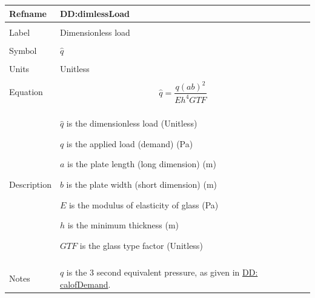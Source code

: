 \documentclass[12pt]{article}
\begin{document}
\noindent \begin{minipage}{\textwidth}
\begin{tabular}{p{} p{}}
\toprule \textbf{Refname} & \textbf{DD:dimlessLoad}
\label{DD:dimlessLoad}
\\ \midrule \\
Label & Dimensionless load
        \\ \midrule \\
        Symbol & $\hat{q}$
                 \\ \midrule \\
                 Units & Unitless
                         \\ \midrule \\
                         Equation & \begin{displaymath}
                                    \hat{q}=\frac{q \left(a b\right)^{2}}{E h^{4} GTF}
                                    \end{displaymath}
                                    \\ \midrule \\
                                    Description & \begin{symbDescription}
                                                  \item{$\hat{q}$ is the dimensionless load (Unitless)}
                                                  \item{$q$ is the applied load (demand) (Pa)}
                                                  \item{$a$ is the plate length (long dimension) (m)}
                                                  \item{$b$ is the plate width (short dimension) (m)}
                                                  \item{$E$ is the modulus of elasticity of glass (Pa)}
                                                  \item{$h$ is the minimum thickness (m)}
                                                  \item{$GTF$ is the glass type factor (Unitless)}
                                                  \end{symbDescription}
                                                  \\ \midrule \\
                                                  Notes & $q$ is the 3 second equivalent pressure, as given in \hyperref[DD:calofDemand]{DD: calofDemand}.

\end{tabular}
\end{minipage}
\end{document}
